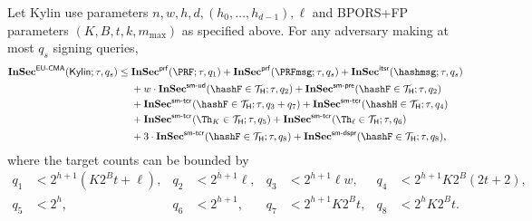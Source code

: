 \begin{theorem}
\label{thm:proof-kylin}
Let Kylin use parameters $n,w,h,d,(h_0,\ldots,h_{d-1}),\ell$ and BPORS+FP
parameters $(K,B,t,k,m_{\max})$ as specified above.  For any adversary making
at most $q_s$ signing queries,
\begin{align}
\InSec{EU\text{-}CMA}(\mathsf{Kylin};\tau,q_s)
\le{}&
    \InSec{prf}(\PRF;\tau,q_1)
    +\InSec{prf}(\PRFmsg;\tau,q_s)
    +\InSec{itsr}(\hashmsg;\tau,q_s) \notag\\
&   +w\cdot\InSec{sm\text{-}ud}(\hashF\in\THFColl;\tau,q_2)
    +\InSec{sm\text{-}pre}(\hashF\in\THFColl;\tau,q_2) \notag\\
&   +\InSec{sm\text{-}tcr}(\hashF\in\THFColl;\tau,q_3+q_7)
    +\InSec{sm\text{-}tcr}(\hashH\in\THFColl;\tau,q_4) \notag\\
&   +\InSec{sm\text{-}tcr}(\Th_K\in\THFColl;\tau,q_5)
    +\InSec{sm\text{-}tcr}(\Th_\ell\in\THFColl;\tau,q_6) \notag\\
&   +3\cdot\InSec{sm\text{-}tcr}(\hashF\in\THFColl;\tau,q_8)
    +\InSec{sm\text{-}dspr}(\hashF\in\THFColl;\tau,q_8),
\label{eq:proof-kylin-bound}
\end{align}
where the target counts can be bounded by
\begin{align*}
q_1 &< 2^{h+1}(K2^B t+\ell),&
q_2 &< 2^{h+1}\ell,&
q_3 &< 2^{h+1}\ell w,&
q_4 &< 2^{h+1}K2^B(2t+2),\\
q_5 &< 2^h,&
q_6 &< 2^{h+1},&
q_7 &< 2^{h+1}K2^B t,&
q_8 &< 2^hK2^B t.
\end{align*}
\end{theorem}

